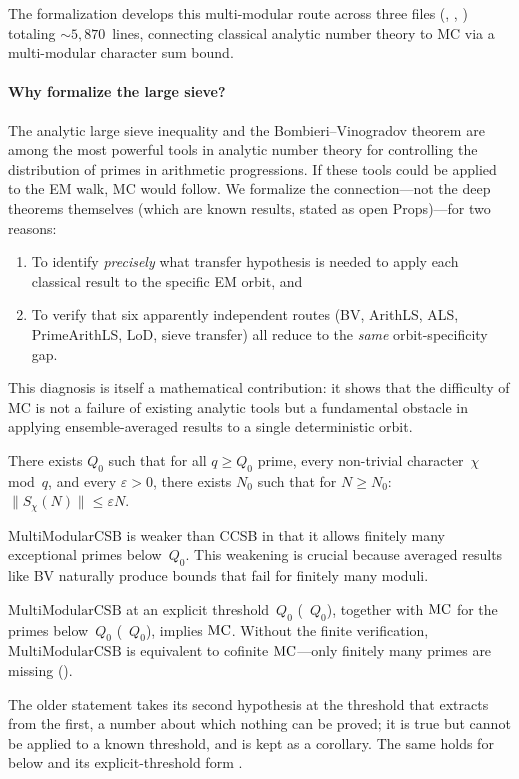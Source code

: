 The formalization develops this multi-modular route across three files
(, ,
) totaling ${\sim}5{,}870$~lines,
connecting classical analytic number theory to MC via a multi-modular
character sum bound.

\paragraph{Why formalize the large sieve?}
The analytic large sieve inequality and the Bombieri--Vinogradov theorem
are among the most powerful tools in analytic number theory for
controlling the distribution of primes in arithmetic progressions.
If these tools could be applied to the EM walk, MC would follow.
We formalize the connection---not the deep theorems themselves (which
are known results, stated as open Props)---for two reasons:
\begin{enumerate}[nosep]
\item To identify \emph{precisely} what transfer hypothesis is needed to
  apply each classical result to the specific EM orbit, and
\item To verify that six apparently independent routes (BV, ArithLS, ALS,
  PrimeArithLS, LoD, sieve transfer) all reduce to the \emph{same}
  orbit-specificity gap.
\end{enumerate}
This diagnosis is itself a mathematical contribution: it shows that the
difficulty of MC is not a failure of existing analytic tools but a
fundamental obstacle in applying ensemble-averaged results to a single
deterministic orbit.

\begin{property}
There exists $Q_0$ such that for all $q \geq Q_0$ prime, every
non-trivial character~$\chi$ mod~$q$, and every $\varepsilon > 0$,
there exists $N_0$ such that for $N \geq N_0$:
$\|S_\chi(N)\| \leq \varepsilon N$.
\end{property}

MultiModularCSB is weaker than CCSB in that it allows finitely many
exceptional primes below~$Q_0$.  This weakening is crucial because
averaged results like BV naturally produce bounds that fail for
finitely many moduli.

\begin{theorem}
\label{thm:mmcsb-mc}
$\mathrm{MultiModularCSB}$ at an explicit threshold~$Q_0$
(~$Q_0$), together with $\mathrm{MC}$ for
the primes below~$Q_0$ (~$Q_0$), implies $\mathrm{MC}$.
Without the finite verification, $\mathrm{MultiModularCSB}$ is
equivalent to cofinite $\mathrm{MC}$---only finitely many primes are missing
().
\end{theorem}
\noindent The older statement  takes its
second hypothesis at the threshold that  extracts
from the first, a number about which nothing can be proved; it is true
but cannot be applied to a known threshold, and is kept as a corollary.
The same holds for  below and its
explicit-threshold form .

